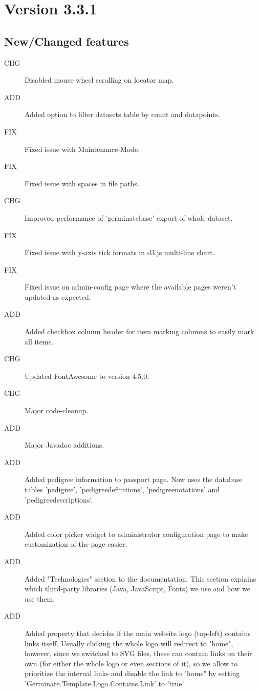 \section{Version 3.3.1}
\label{sec:3.3.1}

\subsection{New/Changed features}
\begin{description}
	\item[CHG] Disabled mouse-wheel scrolling on locator map.
	\item[ADD] Added option to filter datasets table by count and datapoints.
	\item[FIX] Fixed issue with Maintenance-Mode.
	\item[FIX] Fixed issue with spaces in file paths.
	\item[CHG] Improved performance of 'germinatebase' export of whole dataset.
	\item[FIX] Fixed issue with y-axis tick formats in d3.js multi-line chart.
	\item[FIX] Fixed issue on admin-config page where the available pages weren't updated as expected.
	\item[ADD] Added checkbox column header for item marking columns to easily mark all items.
	\item[CHG] Updated FontAwesome to version 4.5.0.
	\item[CHG] Major code-cleanup.
	\item[ADD] Major Javadoc additions.
	\item[ADD] Added pedigree information to passport page. Now uses the database tables 'pedigree', 'pedigreedefinitions', 'pedigreenotations' and 'pedigreedescriptions'.
	\item[ADD] Added color picker widget to administrator configuration page to make customization of the page easier.
	\item[ADD] Added "Technologies" section to the documentation. This section explains which third-party libraries (Java, JavaScript, Fonts) we use and how we use them.
	\item[ADD] Added property that decides if the main website logo (top-left) contains links itself. Usually clicking the whole logo will redirect to "home", however, since we switched to SVG files, these can contain links on their own (for either the whole logo or even sections of it), so we allow to prioritize the internal links and disable the link to "home" by setting 'Germinate.Template.Logo.Contains.Link' to 'true'.

\end{description}
